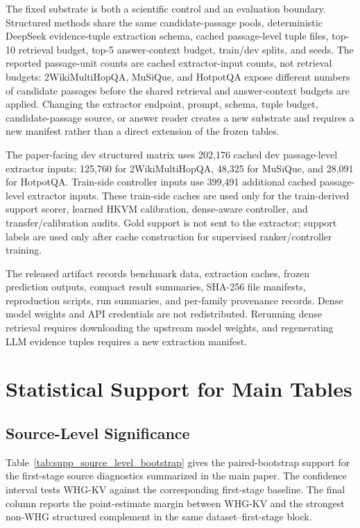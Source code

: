 \documentclass[conference]{IEEEtran}
\begin{document}
The fixed substrate is both a scientific control and an evaluation boundary. Structured methods share the same candidate-passage pools, deterministic DeepSeek evidence-tuple extraction schema, cached passage-level tuple files, top-10 retrieval budget, top-5 answer-context budget, train/dev splits, and seeds. The reported passage-unit counts are cached extractor-input counts, not retrieval budgets: 2WikiMultiHopQA, MuSiQue, and HotpotQA expose different numbers of candidate passages before the shared retrieval and answer-context budgets are applied. Changing the extractor endpoint, prompt, schema, tuple budget, candidate-passage source, or answer reader creates a new substrate and requires a new manifest rather than a direct extension of the frozen tables.

The paper-facing dev structured matrix uses 202,176 cached dev passage-level extractor inputs: 125,760 for 2WikiMultiHopQA, 48,325 for MuSiQue, and 28,091 for HotpotQA. Train-side controller inputs use 399,491 additional cached passage-level extractor inputs. These train-side caches are used only for the train-derived support scorer, learned HKVM calibration, dense-aware controller, and transfer/calibration audits. Gold support is not sent to the extractor; support labels are used only after cache construction for supervised ranker/controller training.

The released artifact records benchmark data, extraction caches, frozen prediction outputs, compact result summaries, SHA-256 file manifests, reproduction scripts, run summaries, and per-family provenance records. Dense model weights and API credentials are not redistributed. Rerunning dense retrieval requires downloading the upstream model weights, and regenerating LLM evidence tuples requires a new extraction manifest.

\section{Statistical Support for Main Tables}

\subsection{Source-Level Significance}

Table~\ref{tab:supp_source_level_bootstrap} gives the paired-bootstrap support for the first-stage source diagnostics summarized in the main paper. The confidence interval tests WHG-KV against the corresponding first-stage baseline. The final column reports the point-estimate margin between WHG-KV and the strongest non-WHG structured complement in the same dataset--first-stage block.
\end{document}
